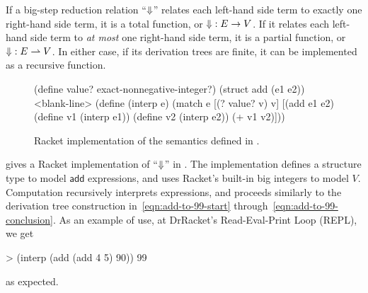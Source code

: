 If a big-step reduction relation ``$\operatorname{\Downarrow}$'' relates each left-hand side term to exactly one right-hand side term, it is a total function, or $\operatorname{\Downarrow} : E \to V$.
If it relates each left-hand side term to \emph{at most} one right-hand side term, it is a partial function, or $\operatorname{\Downarrow} : E \rightharpoonup V$.
In either case, if its derivation trees are finite, it can be implemented as a recursive function.

\begin{figure*}[tb]\centering
\begin{schemedisplay}
(define value? exact-nonnegative-integer?)
(struct add (e1 e2))
<blank-line>
(define (interp e)
  (match e
    [(? value? v)  v]
    [(add e1 e2)  (define v1 (interp e1))
                  (define v2 (interp e2))
                  (+ v1 v2)]))
\end{schemedisplay}
\bottomhrule
\caption[ ]{Racket implementation of the semantics defined in .}
\label{fig:add-language-impl}
\end{figure*}

 gives a Racket implementation of ``$\operatorname{\Downarrow}$'' in .
The implementation defines a structure type  to model $\mathsf{add}$ expressions, and uses Racket's built-in big integers to model $V$.
Computation recursively interprets expressions, and proceeds similarly to the derivation tree construction in~\eqref{eqn:add-to-99-start} through~\eqref{eqn:add-to-99-conclusion}.
As an example of use, at DrRacket's Read-Eval-Print Loop (REPL), we get
\begin{center}
\singlespacing
\begin{schemedisplay}
          > (interp (add (add 4 5) 90))
          99
\end{schemedisplay}
\end{center}
as expected.

